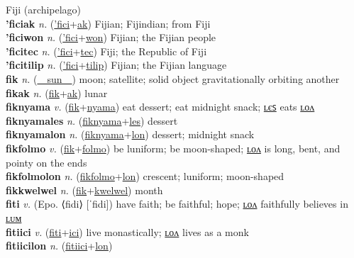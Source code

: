 Fiji (archipelago) \label{'fici} \\
\textbf{'ficiak} \textit{n.} (\hyperref['fici]{'fici}+\hyperref[ak]{ak})
Fijian; Fijindian; from Fiji \label{'ficiak} \\
\textbf{'ficiwon} \textit{n.} (\hyperref['fici]{'fici}+\hyperref[won]{won})
Fijian; the Fijian people \label{'ficiwon} \\
\textbf{'ficitec} \textit{n.} (\hyperref['fici]{'fici}+\hyperref[tec]{tec})
Fiji; the Republic of Fiji \label{'ficitec} \\
\textbf{'ficitilip} \textit{n.} (\hyperref['fici]{'fici}+\hyperref[tilip]{tilip})
Fijian; the Fijian language \label{'ficitilip} \\
\textbf{fik} \textit{n.} (\hyperref[sun]{~~sun~~})
moon; satellite; solid object gravitationally orbiting another \label{fik} \\
\textbf{fikak} \textit{n.} (\hyperref[fik]{fik}+\hyperref[ak]{ak})
lunar \label{fikak} \\
\textbf{fiknyama} \textit{v.} (\hyperref[fik]{fik}+\hyperref[nyama]{nyama})
eat dessert; eat midnight snack; \hyperref[fiknyamales]{ʟєꜱ} eats \hyperref[fiknyamalon]{ʟᴏᴧ} \label{fiknyama} \\
\textbf{fiknyamales} \textit{n.} (\hyperref[fiknyama]{fiknyama}+\hyperref[les]{les})
dessert \label{fiknyamales} \\
\textbf{fiknyamalon} \textit{n.} (\hyperref[fiknyama]{fiknyama}+\hyperref[lon]{lon})
dessert; midnight snack \label{fiknyamalon} \\
\textbf{fikfolmo} \textit{v.} (\hyperref[fik]{fik}+\hyperref[folmo]{folmo})
be luniform; be moon-shaped; \hyperref[fikfolmolon]{ʟᴏᴧ} is long, bent, and pointy on the ends \label{fikfolmo} \\
\textbf{fikfolmolon} \textit{n.} (\hyperref[fikfolmo]{fikfolmo}+\hyperref[lon]{lon})
crescent; luniform; moon-shaped \label{fikfolmolon} \\
\textbf{fikkwelwel} \textit{n.} (\hyperref[fik]{fik}+\hyperref[kwelwel]{kwelwel})
month \label{fikkwelwel} \\
\textbf{fiti} \textit{v.} (Epo. ⟨fidi⟩ [ˈfidi])
have faith; be faithful; hope; \hyperref[fitilon]{ʟᴏᴧ} faithfully believes in \hyperref[fitilum]{ʟᴜᴍ} \label{fiti} \\
\textbf{fitiici} \textit{v.} (\hyperref[fiti]{fiti}+\hyperref[ici]{ici})
live monastically; \hyperref[fitiicilon]{ʟᴏᴧ} lives as a monk \label{fitiici} \\
\textbf{fitiicilon} \textit{n.} (\hyperref[fitiici]{fitiici}+\hyperref[lon]{lon})
